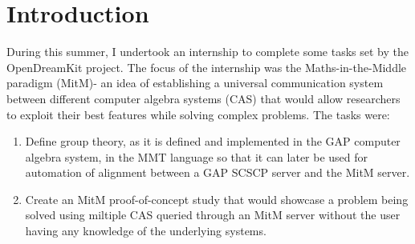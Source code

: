 \section{Introduction}
During this summer, I undertook an internship to complete some tasks set by the OpenDreamKit project. The focus of the internship was the Maths-in-the-Middle paradigm (MitM)- an idea of establishing a universal communication system between different computer algebra systems (CAS) that would allow researchers to exploit their best features while solving complex problems. The tasks were:
\begin{enumerate}
    \item Define group theory, as it is defined and implemented in the GAP computer algebra system, in the MMT language so that it can later be used for automation of alignment between a GAP SCSCP server and the MitM server.
    \item Create an MitM proof-of-concept study that would showcase a problem being solved using miltiple CAS queried through an MitM server without the user having any knowledge of the underlying systems.
\end{enumerate}